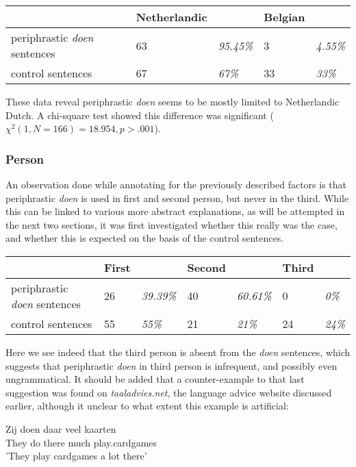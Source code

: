 \documentclass[12pt]{article}
\begin{document}
\begin{table}[h] 
\begin{tabular}{|l||ll|ll|} 
\hline
&Netherlandic&&Belgian&\\
\hline
periphrastic \emph{doen} sentences	&63 	& \emph{95.45\%}	&3		 &\emph{4.55\%}\\
control sentences					&67		& \emph{67\%}		&33		 &\emph{33\%}\\
\hline
\end{tabular}
\end{table}

These data reveal periphrastic \emph{doen} seems to be mostly limited to Netherlandic Dutch. A chi-square test showed this difference was significant ($\chi^2(1, N=166) = 18.954, p > .001$).

\subsubsection{Person}

An observation done while annotating for the previously described factors is that periphrastic \emph{doen} is used in first and second person, but never in the third. While this can be linked to various more abstract explanations, as will be attempted in the next two sections, it was first investigated whether this really was the case, and whether this is expected on the basis of the control sentences.

\begin{table}[h]
\begin{tabular}{|l||ll|ll|ll|}
\hline
&First&&Second&&Third&\\
\hline
periphrastic \emph{doen} sentences	&26 	& \emph{39.39\%}	&40		&\emph{60.61\%} 	& 0 &\emph{0\%}\\
control sentences					&55		& \emph{55\%}		&21	 	&\emph{21\%} 		& 24 &\emph{24\%}\\
\hline
\end{tabular}
\end{table}

Here we see indeed that the third person is absent from the \emph{doen} sentences, which suggests that periphrastic \emph{doen} in third person is infrequent, and possibly even ungrammatical. It should be added that a counter-example to that last suggestion was found on \emph{taaladvies.net}, the language advice website discussed earlier, although it unclear to what extent this example is artificial:

\begin{exe}
\ex \gll Zij doen daar veel kaarten\\
They do there much play.cardgames\\
'They play cardgames a lot there'
\end{exe}
\end{document}

